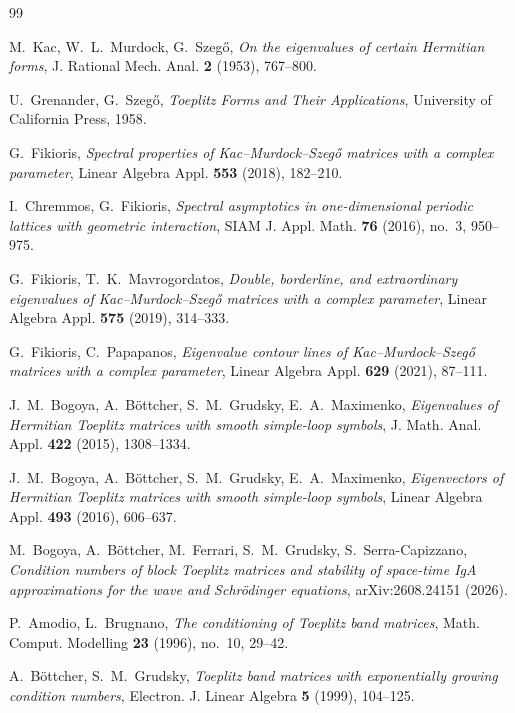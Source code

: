\documentclass[11pt,reqno]{amsart}
\theoremstyle{plain}
\theoremstyle{definition}
\begin{document}
\begin{thebibliography}{99}

M.~Kac, W.~L.~Murdock, G.~Szeg\H{o},
\emph{On the eigenvalues of certain Hermitian forms},
J. Rational Mech. Anal. \textbf{2} (1953), 767--800.

U.~Grenander, G.~Szeg\H{o},
\emph{Toeplitz Forms and Their Applications},
University of California Press, 1958.

G.~Fikioris,
\emph{Spectral properties of Kac--Murdock--Szeg\H{o} matrices with a complex parameter},
Linear Algebra Appl. \textbf{553} (2018), 182--210.

I.~Chremmos, G.~Fikioris,
\emph{Spectral asymptotics in one-dimensional periodic lattices with geometric interaction},
SIAM J. Appl. Math. \textbf{76} (2016), no.~3, 950--975.

G.~Fikioris, T.~K.~Mavrogordatos,
\emph{Double, borderline, and extraordinary eigenvalues of Kac--Murdock--Szeg\H{o}
matrices with a complex parameter},
Linear Algebra Appl. \textbf{575} (2019), 314--333.

G.~Fikioris, C.~Papapanos,
\emph{Eigenvalue contour lines of Kac--Murdock--Szeg\H{o} matrices with a complex parameter},
Linear Algebra Appl. \textbf{629} (2021), 87--111.

J.~M.~Bogoya, A.~B\"ottcher, S.~M.~Grudsky, E.~A.~Maximenko,
\emph{Eigenvalues of Hermitian Toeplitz matrices with smooth simple-loop symbols},
J. Math. Anal. Appl. \textbf{422} (2015), 1308--1334.

J.~M.~Bogoya, A.~B\"ottcher, S.~M.~Grudsky, E.~A.~Maximenko,
\emph{Eigenvectors of Hermitian Toeplitz matrices with smooth simple-loop symbols},
Linear Algebra Appl. \textbf{493} (2016), 606--637.

M.~Bogoya, A.~B\"ottcher, M.~Ferrari, S.~M.~Grudsky, S.~Serra-Capizzano,
\emph{Condition numbers of block Toeplitz matrices and stability of space-time IgA
approximations for the wave and Schr\"odinger equations},
arXiv:2608.24151 (2026).

P.~Amodio, L.~Brugnano,
\emph{The conditioning of Toeplitz band matrices},
Math. Comput. Modelling \textbf{23} (1996), no.~10, 29--42.

A.~B\"ottcher, S.~M.~Grudsky,
\emph{Toeplitz band matrices with exponentially growing condition numbers},
Electron. J. Linear Algebra \textbf{5} (1999), 104--125.


\end{thebibliography}
\end{document}
